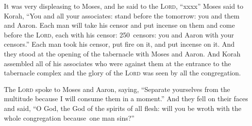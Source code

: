 \begin{inparaenum}
     It was very displeasing to Moses, and he said to the \textsc{Lord}, ``xxxx''%
     Moses said to Korah, ``You and all your associates: stand before the  tomorrow: you and them and Aaron.%
     Each man will take his censor and put incense on them and come before the \textsc{Lord}, each with his censor: 250~censors: you and Aaron with your censors.''%
     Each man took his censor, put fire on it, and put incense on it. And they stood at the opening of the tabernacle with Moses and Aaron.%
     And Korah assembled all of his associates who were against them at the entrance to the tabernacle complex and the glory of the \textsc{Lord} was seen by all the congregation.%
    
     The \textsc{Lord} spoke to Moses and Aaron, saying,%
     ``Separate yourselves from the multitude because I will consume them in a moment.''%
     And they fell on their faces and said, ``O God, the God of the spirits of all flesh: will you be wroth with the whole congregation because\understood\ one man sins?''%
    

\end{inparaenum}
